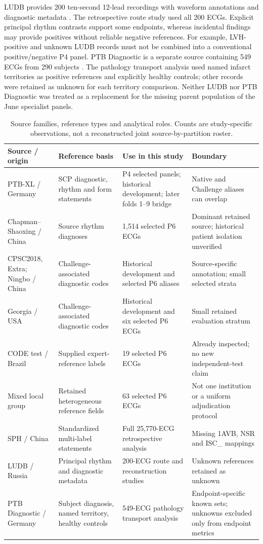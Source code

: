 LUDB provides 200 ten-second 12-lead recordings with waveform annotations and diagnostic metadata \citep{LUDB2021,LUDB2020Paper}. The retrospective route study used all 200 ECGs. Explicit principal rhythm contrasts support some endpoints, whereas incidental findings may provide positives without reliable negative references. For example, LVH-positive and unknown LUDB records must not be combined into a conventional positive/negative P4 panel. PTB Diagnostic is a separate source containing 549 ECGs from 290 subjects \citep{PTBDiagnostic}. The pathology transport analysis used named infarct territories as positive references and explicitly healthy controls; other records were retained as unknown for each territory comparison. Neither LUDB nor PTB Diagnostic was treated as a replacement for the missing parent population of the June specialist panels.

\begin{table}[tbp]
\caption{Source families, reference types and analytical roles. Counts are study-specific observations, not a reconstructed joint source-by-partition roster.\label{tab:datasets}}
\centering\small
\begin{tabular}{@{}p{.19\linewidth}p{.25\linewidth}p{.26\linewidth}p{.23\linewidth}@{}}
\toprule
Source / origin & Reference basis & Use in this study & Boundary \\
\midrule
PTB-XL / Germany & SCP diagnostic, rhythm and form statements & P4 selected panels; historical development; later folds 1--9 bridge & Native and Challenge aliases can overlap \\
Chapman--Shaoxing / China & Source rhythm diagnoses & 1,514 selected P6 ECGs & Dominant retained source; historical patient isolation unverified \\
CPSC2018, Extra; Ningbo / China & Challenge-associated diagnostic codes & Historical development and selected P6 aliases & Source-specific annotation; small selected strata \\
Georgia / USA & Challenge-associated diagnostic codes & Historical development and six selected P6 ECGs & Small retained evaluation stratum \\
CODE test / Brazil & Supplied expert-reference labels & 19 selected P6 ECGs & Already inspected; no new independent-test claim \\
Mixed local group & Retained heterogeneous reference fields & 63 selected P6 ECGs & Not one institution or a uniform adjudication protocol \\
SPH / China & Standardized multi-label statements & Full 25,770-ECG retrospective analysis & Missing 1AVB, NSR and ISC\_ mappings \\
LUDB / Russia & Principal rhythm and diagnostic metadata & 200-ECG route and reconstruction studies & Unknown references retained as unknown \\
PTB Diagnostic / Germany & Subject diagnosis, named territory, healthy controls & 549-ECG pathology transport analysis & Endpoint-specific known sets; unknowns excluded only from endpoint metrics \\
\bottomrule
\end{tabular}
\end{table}

